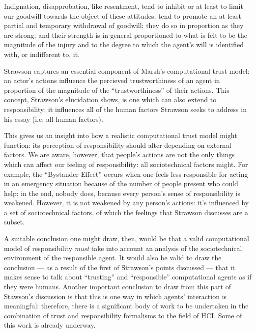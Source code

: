 \begin{displayquote}
    Indignation, disapprobation, like resentment, tend to inhibit or at least to limit our goodwill towards the object of these attitudes, tend to promote an at least partial and temporary withdrawal of goodwill; they do so in proportion as they are strong; and their strength is in general proportioned to what is felt to be the magnitude of the injury and to the degree to which the agent’s will is identified with, or indifferent to, it.
\end{displayquote}\cite{strawson}\par

Strawson captures an essential component of Marsh's computational trust model: an actor's actions influence the percieved trustworthiness of an agent in proportion of the magnitude of the ``trustworthiness'' of their actions. This concept, Strawson's elucidation shows, is one which can also extend to responsibility; it influences all of the human factors Strawson seeks to address in his essay (i.e. all human factors).\par

This gives us an insight into how a realistic computational trust model might function: its perception of responsibility should alter depending on external factors. We are aware, however, that people's actions are not the only things which can affect our feeling of responsibility: all sociotechnical factors might. For example, the ``Bystander Effect''\cite{unresponsive_bystander} occurs when one feels less responsible for acting in an emergency situation because of the number of people present who could help; in the end, nobody does, because every person's sense of responsibility is weakened. However, it is not weakened by any person's actions: it's influenced by a set of sociotechnical factors, of which the feelings that Strawson discusses are a subset.\par

A suitable conclusion one might draw, then, would be that a valid computational model of responsibility \emph{must} take into account an analysis of the sociotechnical environment of the responsible agent. It would also be valid to draw the conclusion --- as a result of the first of Strawson's points discussed --- that it makes sense to talk about ``trusting'' and ``responsible'' computational agents as if they were humans. Another important conclusion to draw from this part of Stawson's discussion is that this is one way in which agents' interaction is meaningful: therefore, there is a significant body of work to be undertaken in the combination of trust and responsibility formalisms to the field of HCI. Some of this work is already underway\cite{Marsh2011, Macy2002}. \par

